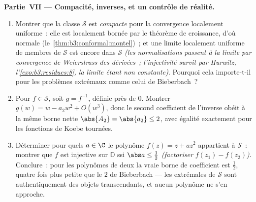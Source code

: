\begin{problem}
\begin{enumerate}[resume]
\end{enumerate}
\medskip
\noindent\textbf{Partie~VII --- Compacité, inverses, et un
contrôle de réalité.}
\begin{enumerate}[resume]
  \item Montrer que la classe $\mathcal S$ est
        \emph{compacte} pour la convergence localement
        uniforme~: elle est localement bornée par le
        théorème de croissance, d'où normale
        (le~\cref{thm:b3:conformal:montel})~; et une limite
        localement uniforme de membres de $\mathcal S$ est
        encore dans $\mathcal S$ \emph{(les normalisations
        passent à la limite par convergence de Weierstrass
        des dérivées~; l'injectivité survit par Hurwitz,
        l'\cref{exo:b3:residues:8}, la limite étant non
        constante)}. Pourquoi cela importe-t-il pour les
        problèmes extrémaux comme celui de Bieberbach~?
  \item Pour $f \in \mathcal S$, soit $g = f^{-1}$, définie
        près de $0$. Montrer $g(w) = w - a_2w^2 + O(w^3)$,
        donc le second coefficient de l'inverse obéit à la
        même borne nette $\abs{A_2} = \abs{a_2} \leq 2$,
        avec égalité exactement pour les fonctions de Koebe
        tournées.
  \item Déterminer pour quels $a \in \C$ le polynôme $f(z)
        = z + az^2$ appartient à $\mathcal S$~: montrer que
        $f$ est injective sur $\mathbb D$ ssi $\abs a \leq
        \frac12$ \emph{(factoriser $f(z_1) - f(z_2)$)}.
        Conclure~: pour les polynômes de  deux la vraie
        borne de coefficient est $\frac12$, quatre fois plus
        petite que le $2$ de Bieberbach --- les extrémales
        de $\mathcal S$ sont authentiquement des objets
        transcendants, et aucun polynôme ne s'en approche.
\end{enumerate}
\end{problem}
